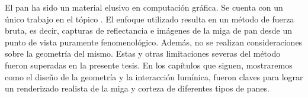 El pan ha sido un material elusivo en computación gráfica.
Se cuenta con un único trabajo en el tópico \cite{Tong2005}.
El enfoque utilizado resulta en un método de fuerza bruta, es decir, capturas de reflectancia e imágenes de la miga de pan desde un punto de vista puramente fenomenológico.
Además, no se realizan consideraciones sobre la geometría del mismo.
Estas y otras limitaciones severas del método fueron superadas en la presente tesis.
En los capítulos que siguen, mostraremos como el diseño de la geometría y la interacción lumínica, fueron claves para lograr un renderizado realista de la miga y corteza de diferentes tipos de panes.

